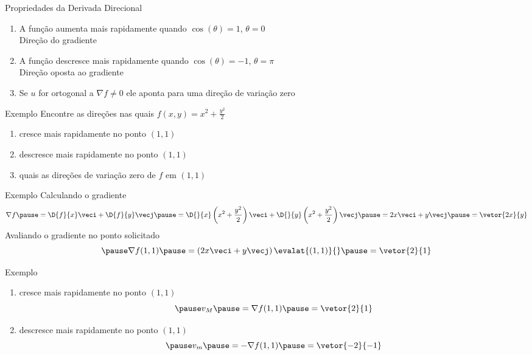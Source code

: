 \begin{frame}{Propriedades da Derivada Direcional}
\begin{enumerate}[<+->]
  \setlength\itemsep{1.5em}
  \item A função aumenta mais rapidamente quando $\cos(\theta)=1$, $\theta=0$ \\
        Direção do gradiente
  \item A função descresce mais rapidamente quando $\cos(\theta)=-1$, $\theta=\pi$ \\
        Direção oposta ao gradiente
  \item Se $u$ for ortogonal a \(\nabla f\neq 0\) ele aponta para uma direção de variação zero
\end{enumerate}
\end{frame}

\addtocounter{exemplo}{1}
\begin{frame}{Exemplo \theexemplo}
  Encontre as direções nas quais \(f(x, y) = x^2 + \frac{y^2}{2}\)
  \begin{enumerate}
    \item[a)] cresce mais rapidamente no ponto \((1, 1)\)
    \item[b)] descresce mais rapidamente no ponto \((1, 1)\)
    \item[c)] quais as direções de variação zero de $f$ em \((1, 1)\)
  \end{enumerate}
\end{frame}

\begin{frame}{Exemplo \theexemplo}
  Calculando o gradiente
  \[
    \nabla f
    \pause
    = \D{f}{x} \veci + \D{f}{y}\vecj
    \pause
    = \D{}{x}\left(x^2 + \frac{y^2}{2}\right) \veci
    + \D{}{y}\left(x^2 + \frac{y^2}{2}\right) \vecj
    \pause
    = 2x\veci + y\vecj
    \pause
    = \vetor{2x}{y}
  \]
  \pause
  Avaliando o gradiente no ponto solicitado
  \[
    \pause
    \nabla f (1, 1)
    \pause
    = \left(2x\veci + y\vecj\right)\evalat{(1, 1)}{}
    \pause
    = \vetor{2}{1}
  \]
\end{frame}

\begin{frame}{Exemplo \theexemplo}
  \begin{enumerate}
  \item[a)]
    \pause
    cresce mais rapidamente no ponto \((1, 1)\)
    \[
      \pause
      v_M
      \pause
      = \nabla f(1, 1)
      \pause
      = \vetor{2}{1}
    \]
  \item[b)]
    \pause
    descresce mais rapidamente no ponto \((1, 1)\)
    \[
      \pause
      v_m
      \pause
      = -\nabla f (1, 1)
      \pause
      = \vetor{-2}{-1}
    \]
\end{enumerate}
\end{frame}


